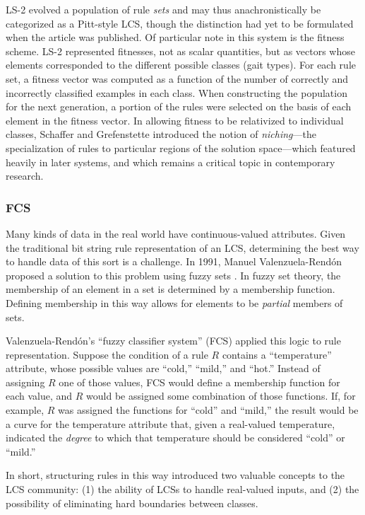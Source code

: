 \documentclass[11pt]{article}
\begin{document}
LS-2 evolved a population of rule \emph{sets} and may thus anachronistically be categorized as a Pitt-style LCS, though the distinction had yet to be formulated when the article was published. Of particular note in this system is the fitness scheme. LS-2 represented fitnesses, not as scalar quantities, but as vectors whose elements corresponded to the different possible classes (gait types). For each rule set, a fitness vector was computed as a function of the number of correctly and incorrectly classified examples in each class. When constructing the population for the next generation, a portion of the rules were selected on the basis of each element in the fitness vector. In allowing fitness to be relativized to individual classes, Schaffer and Grefenstette introduced the notion of \emph{niching}---the specialization of rules to particular regions of the solution space---which  featured heavily in later systems, and which remains a critical topic in contemporary research.

\subsubsection{FCS}

Many kinds of data in the real world have continuous-valued attributes. Given the traditional bit string rule representation of an LCS, determining the best way to handle data of this sort is a challenge. In 1991, Manuel Valenzuela-Rend\'on proposed a solution to this problem using fuzzy sets \cite{manuel_valenzuela-rendon_fuzzy_1991}. In fuzzy set theory, the membership of an element in a set is determined by a membership function. Defining membership in this way allows for elements to be \emph{partial} members of sets.

Valenzuela-Rend\'on's ``fuzzy classifier system'' (FCS) applied this logic to rule representation. Suppose the condition of a rule $R$ contains a ``temperature'' attribute, whose possible values are ``cold,'' ``mild,'' and ``hot.'' Instead of assigning $R$ one of those values, FCS would define a membership function for each value, and $R$ would be assigned some combination of those functions. If, for example, $R$ was assigned the functions for ``cold'' and ``mild,'' the result would be a curve for the temperature attribute that, given a real-valued temperature, indicated the \emph{degree} to which that temperature should be considered ``cold'' or ``mild.''

In short, structuring rules in this way introduced two valuable concepts to the LCS community: (1) the ability of LCSs to handle real-valued inputs, and (2) the possibility of eliminating hard boundaries between classes.
\end{document}
